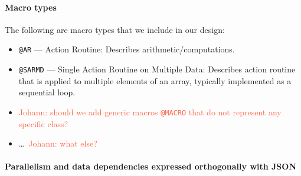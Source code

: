 \documentclass{article}
\newcommand{\Johann}[1]         {\textcolor{Tomato}{Johann: #1}}
\begin{document}
\paragraph{Macro types}

The following are macro types that we include in our design:
\begin{itemize}
  \item \texttt{@AR} --- Action Routine: Describes arithmetic/computations.
  \item \texttt{@SARMD} --- Single Action Routine on Multiple Data: Describes
    action routine that is applied to multiple elements of an array, typically
    implemented as a sequential loop.
  \item \Johann{should we add generic macros \texttt{@MACRO} that do not
    represent any specific class?}
  \item \ldots\ \Johann{what else?}
\end{itemize}

\paragraph{Parallelism and data dependencies expressed orthogonally with JSON}
\end{document}
